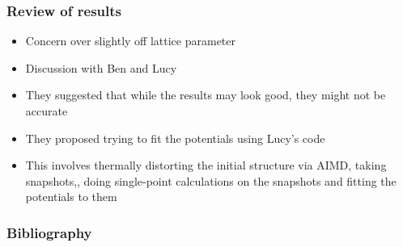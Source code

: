 \documentclass{beamer}
\begin{document}
\begin{frame}
\frametitle{Review of results}

\begin{itemize}
  \item Concern over slightly off lattice parameter
  \item Discussion with Ben and Lucy
  \item They suggested that while the results may look good, they might not be accurate
  \item They proposed trying to fit the potentials using Lucy's code
  \item This involves thermally distorting the initial structure via AIMD, taking snapshots,, doing single-point calculations on the snapshots and fitting the potentials to them
\end{itemize}

\end{frame}

\begin{frame}[shrink=20]
\frametitle{Bibliography}



\end{frame}
\end{document}
